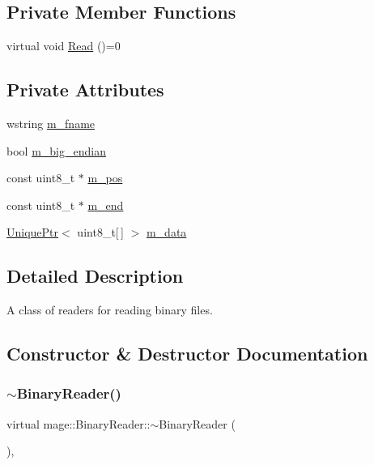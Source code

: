 \subsection*{Private Member Functions}
\begin{DoxyCompactItemize}
\item 
virtual void \hyperlink{classmage_1_1_binary_reader_a5c060c165f17a71f4218eb98c7091273}{Read} ()=0
\end{DoxyCompactItemize}
\subsection*{Private Attributes}
\begin{DoxyCompactItemize}
\item 
wstring \hyperlink{classmage_1_1_binary_reader_a9c97c02d53ce60a9952751ad4f55414f}{m\+\_\+fname}
\item 
bool \hyperlink{classmage_1_1_binary_reader_a8d23fde958e08efe248edb5d92861113}{m\+\_\+big\+\_\+endian}
\item 
const uint8\+\_\+t $\ast$ \hyperlink{classmage_1_1_binary_reader_a086c8b8615dddb15a97acf657bb4d73b}{m\+\_\+pos}
\item 
const uint8\+\_\+t $\ast$ \hyperlink{classmage_1_1_binary_reader_a929b6480629014c24263ec3042b1f364}{m\+\_\+end}
\item 
\hyperlink{namespacemage_a8c307fbcc33bce9b7f2aa4c26c3b95cf}{Unique\+Ptr}$<$ uint8\+\_\+t\mbox{[}$\,$\mbox{]} $>$ \hyperlink{classmage_1_1_binary_reader_a34820a214a5b98e09beb12e8a465b0e3}{m\+\_\+data}
\end{DoxyCompactItemize}


\subsection{Detailed Description}
A class of readers for reading binary files. 

\subsection{Constructor \& Destructor Documentation}
\hypertarget{classmage_1_1_binary_reader_aa300382cfa1585bb2f76c4e764bb5617}{}\label{classmage_1_1_binary_reader_aa300382cfa1585bb2f76c4e764bb5617} 
\subsubsection{\texorpdfstring{$\sim$\+Binary\+Reader()}{~BinaryReader()}}
{\footnotesize\ttfamily virtual mage\+::\+Binary\+Reader\+::$\sim$\+Binary\+Reader (\begin{DoxyParamCaption}{ }\end{DoxyParamCaption})\hspace{0.3cm}{\ttfamily [virtual]}, {\ttfamily [default]}}

